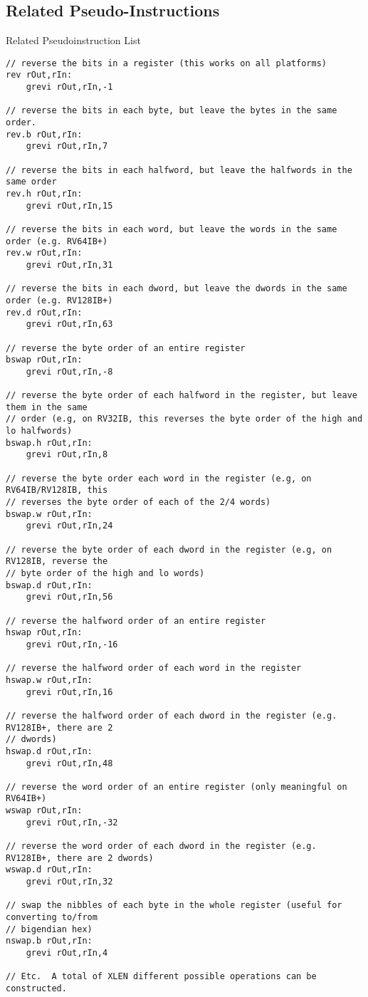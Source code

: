 \subsection{Related Pseudo-Instructions}

Related Pseudoinstruction List

\begin{verbatim}
// reverse the bits in a register (this works on all platforms)
rev rOut,rIn:
    grevi rOut,rIn,-1

// reverse the bits in each byte, but leave the bytes in the same order.
rev.b rOut,rIn:
    grevi rOut,rIn,7

// reverse the bits in each halfword, but leave the halfwords in the same order
rev.h rOut,rIn:
    grevi rOut,rIn,15

// reverse the bits in each word, but leave the words in the same order (e.g. RV64IB+)
rev.w rOut,rIn:
    grevi rOut,rIn,31

// reverse the bits in each dword, but leave the dwords in the same order (e.g. RV128IB+)
rev.d rOut,rIn:
    grevi rOut,rIn,63

// reverse the byte order of an entire register
bswap rOut,rIn:
    grevi rOut,rIn,-8

// reverse the byte order of each halfword in the register, but leave them in the same
// order (e.g, on RV32IB, this reverses the byte order of the high and lo halfwords)
bswap.h rOut,rIn:
    grevi rOut,rIn,8

// reverse the byte order each word in the register (e.g, on RV64IB/RV128IB, this
// reverses the byte order of each of the 2/4 words)
bswap.w rOut,rIn:
    grevi rOut,rIn,24

// reverse the byte order of each dword in the register (e.g, on RV128IB, reverse the
// byte order of the high and lo words)
bswap.d rOut,rIn:
    grevi rOut,rIn,56

// reverse the halfword order of an entire register
hswap rOut,rIn:
    grevi rOut,rIn,-16

// reverse the halfword order of each word in the register
hswap.w rOut,rIn:
    grevi rOut,rIn,16

// reverse the halfword order of each dword in the register (e.g. RV128IB+, there are 2
// dwords)
hswap.d rOut,rIn:
    grevi rOut,rIn,48

// reverse the word order of an entire register (only meaningful on RV64IB+)
wswap rOut,rIn:
    grevi rOut,rIn,-32

// reverse the word order of each dword in the register (e.g. RV128IB+, there are 2 dwords)
wswap.d rOut,rIn:
    grevi rOut,rIn,32

// swap the nibbles of each byte in the whole register (useful for converting to/from
// bigendian hex)
nswap.b rOut,rIn:
    grevi rOut,rIn,4

// Etc.  A total of XLEN different possible operations can be constructed.
\end{verbatim}

